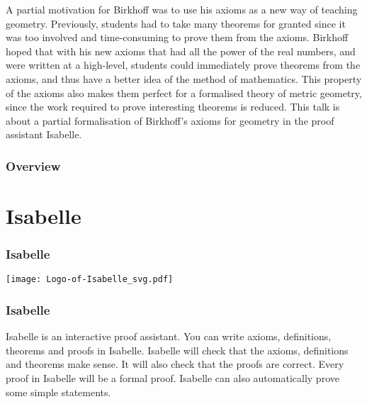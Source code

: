 \documentclass{beamer}
\begin{document}
\begin{frame}[plain] 
  A partial motivation for Birkhoff was to use his axioms as a new way of teaching geometry. Previously, students had to take many theorems for granted since it was too involved and time-consuming to prove them from the axioms. Birkhoff hoped that with his new axioms that had all the power of the real numbers, and were written at a high-level, students could immediately prove theorems from the axioms, and thus have a better idea of the method of mathematics. This property of the axioms also makes them perfect for a formalised theory of metric geometry, since the work required to prove interesting theorems is reduced. This talk is about a partial formalisation of Birkhoff's axioms for geometry in the proof assistant Isabelle.
  \end{frame}
  
\frame{\titlepage}

\begin{frame}
\frametitle{Overview}

 
 \tableofcontents
 
\end{frame}

\section{Isabelle}
\begin{frame}
\frametitle{Isabelle}
 
 \begin{center}
 \graphicspath{{/Users/Imogen/Desktop/Birkhoff_Presentation/}}
\texttt{[image: Logo-of-Isabelle\_svg.pdf]}
 \end{center}
 
\end{frame}

\begin{frame}
\frametitle{Isabelle}
 Isabelle is an interactive proof assistant. You can write axioms, definitions, theorems and proofs in Isabelle. Isabelle will check that the axioms, definitions and theorems make sense. It will also check that the proofs are correct. Every proof in Isabelle will be a formal proof. Isabelle can also automatically prove some simple statements.
 
\end{frame}
\end{document}
